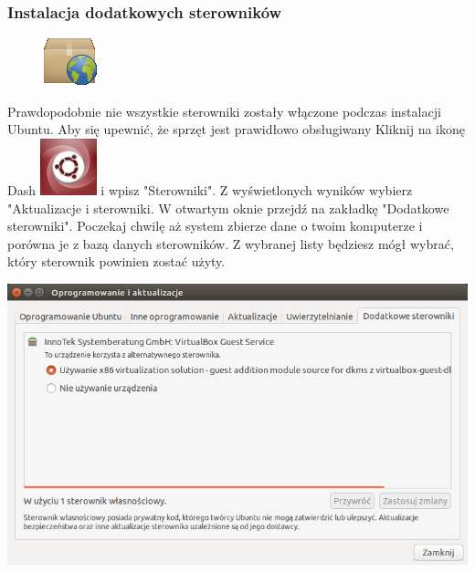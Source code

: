\subsubsection{Instalacja dodatkowych sterowników}
\begin{figure}
        \includegraphics[width=\linewidth]{images/pierwsze_uruchomienie_driver1.png}
\end{figure}
Prawdopodobnie nie wszystkie sterowniki zostały włączone podczas instalacji Ubuntu. Aby się upewnić, że sprzęt jest prawidłowo obsługiwany Kliknij na ikonę Dash \includegraphics[scale=0.35]{images/ikony_dash.png} i wpisz "Sterowniki". Z wyświetlonych wyników wybierz "Aktualizacje i sterowniki. W otwartym oknie przejdź na zakładkę "Dodatkowe sterowniki". Poczekaj chwilę aż system zbierze dane o twoim komputerze i porówna je z bazą danych sterowników. Z wybranej listy będziesz mógł wybrać, który sterownik powinien zostać użyty.
\begin{center}
        \includegraphics[scale=0.95]{images/pierwsze_uruchomienie_driver2.png}
\end{center}
